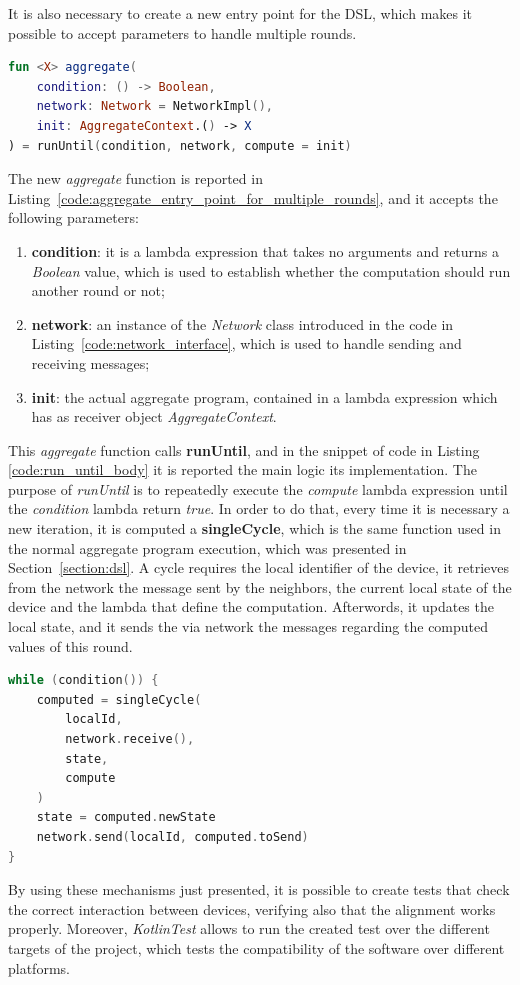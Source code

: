 It is also necessary to create a new entry point for the DSL, which makes it possible to accept parameters to handle multiple rounds.
\begin{lstlisting}[caption={Aggregate programming entry point used to compute multiple rounds}, captionpos=b, language=Kotlin, label={code:aggregate_entry_point_for_multiple_rounds}]
fun <X> aggregate(
    condition: () -> Boolean,
    network: Network = NetworkImpl(),
    init: AggregateContext.() -> X
) = runUntil(condition, network, compute = init)
\end{lstlisting}
The new \textit{aggregate} function is reported in Listing~\ref{code:aggregate_entry_point_for_multiple_rounds}, and it accepts the following parameters:
\begin{enumerate}
    \item \textbf{condition}: it is a lambda expression that takes no arguments and returns a \textit{Boolean} value, which is used to establish whether the computation should run another round or not;
    \item \textbf{network}: an instance of the \textit{Network} class introduced in the code in Listing~\ref{code:network_interface}, which is used to handle sending and receiving messages;
    \item \textbf{init}: the actual aggregate program, contained in a lambda expression which has as receiver object \textit{AggregateContext}.
\end{enumerate}
This \textit{aggregate} function calls \textbf{runUntil},  and in the snippet of code in Listing \ref{code:run_until_body} it is reported the main logic its implementation.\newline
The purpose of \textit{runUntil} is to repeatedly execute the \textit{compute} lambda expression until the \textit{condition} lambda return \textit{true}.\newline
In order to do that, every time it is necessary a new iteration, it is computed a \textbf{singleCycle}, which is the same function used in the normal aggregate program execution, which was presented in Section~\ref{section:dsl}. A cycle requires the local identifier of the device, it retrieves from the network the message sent by the neighbors, the current local state of the device and the lambda that define the computation.\newline
Afterwords, it updates the local state, and it sends the via network the messages regarding the computed values of this round.
\begin{lstlisting}[caption={Main logic of the \textit{runUntil} function}, captionpos=b, language=Kotlin, label={code:run_until_body}]
while (condition()) {
    computed = singleCycle(
        localId,
        network.receive(),
        state,
        compute
    )
    state = computed.newState
    network.send(localId, computed.toSend)
}
\end{lstlisting}

By using these mechanisms just presented, it is possible to create tests that check the correct interaction between devices, verifying also that the alignment works properly. Moreover, \textit{KotlinTest} allows to run the created test over the different targets of the project, which tests the compatibility of the software over different platforms.
